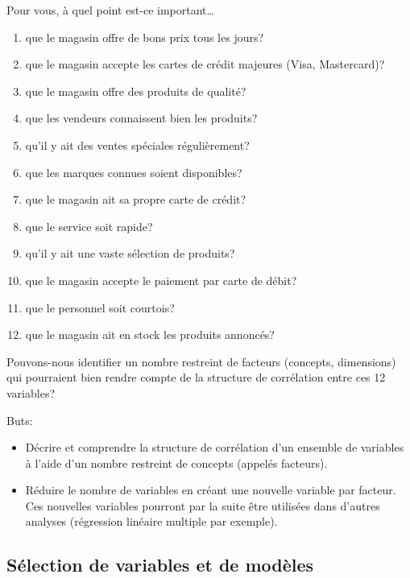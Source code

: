\documentclass[
]{book}
\providecommand{\tightlist}{%
  \setlength{\itemsep}{0pt}\setlength{\parskip}{0pt}}
\theoremstyle{definition}
\theoremstyle{definition}
\theoremstyle{definition}
\theoremstyle{remark}
\begin{document}
Pour vous, à quel point est-ce important\ldots

\begin{enumerate}
\def\labelenumi{\arabic{enumi}.}
\tightlist
\item
  que le magasin offre de bons prix tous les jours?
\item
  que le magasin accepte les cartes de crédit majeures (Visa, Mastercard)?
\item
  que le magasin offre des produits de qualité?
\item
  que les vendeurs connaissent bien les produits?
\item
  qu'il y ait des ventes spéciales régulièrement?
\item
  que les marques connues soient disponibles?
\item
  que le magasin ait sa propre carte de crédit?
\item
  que le service soit rapide?
\item
  qu'il y ait une vaste sélection de produits?
\item
  que le magasin accepte le paiement par carte de débit?
\item
  que le personnel soit courtois?
\item
  que le magasin ait en stock les produits annoncés?
\end{enumerate}

Pouvons-nous identifier un nombre restreint de facteurs (concepts, dimensions) qui pourraient bien rendre compte de la structure de corrélation entre ces 12 variables?

Buts:

\begin{itemize}
\tightlist
\item
  Décrire et comprendre la structure de corrélation d'un ensemble de variables à l'aide d'un nombre restreint de concepts (appelés facteurs).
\item
  Réduire le nombre de variables en créant une nouvelle variable par facteur. Ces nouvelles variables pourront par la suite être utilisées dans d'autres analyses (régression linéaire multiple par exemple).
\end{itemize}

\hypertarget{suxe9lection-de-variables-et-de-moduxe8les}{%
\subsection{Sélection de variables et de modèles}\label{suxe9lection-de-variables-et-de-moduxe8les}}
\end{document}
